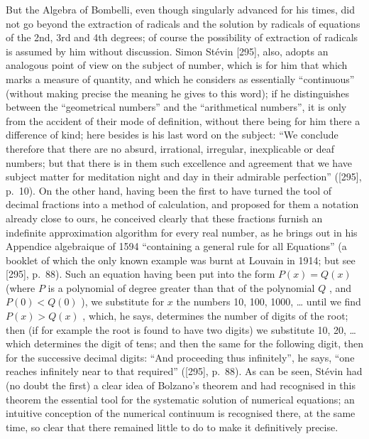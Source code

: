 But the Algebra of Bombelli, even though singularly advanced for his times, did not go beyond the extraction of radicals and the solution by radicals of equations of the 2nd, 3rd and 4th degrees; of course the possibility of extraction of radicals is assumed by him without discussion. Simon Stévin {[}295{]}, also, adopts an analogous point of view on the subject of number, which is for him that which marks a measure of quantity, and which he considers as essentially ``continuous'' (without making precise the meaning he gives to this word); if he distinguishes between the ``geometrical numbers'' and the ``arithmetical numbers'', it is only from the accident of their mode of definition, without there being for him there a difference of kind; here besides is his last word on the subject: ``We conclude therefore that there are no absurd, irrational, irregular, inexplicable or deaf numbers; but that there is in them such excellence and agreement that we have subject matter for meditation night and day in their admirable perfection'' ({[}295{]}, p.~10). On the other hand, having been the first to have turned the tool of decimal fractions into a method of calculation, and proposed for them a notation already close to ours, he conceived clearly that these fractions furnish an indefinite approximation algorithm for every real number, as he brings out in his Appendice algebraique of 1594 ``containing a general rule for all Equations'' (a booklet of which the only known example was burnt at Louvain in 1914; but see {[}295{]}, p.~88). Such an equation having been put into the form \(P(x) = Q(x)\) (where \(P\) is a polynomial of degree greater than that of the polynomial \(Q\) , and \(P(0) < Q(0)\) ), we substitute for \(x\) the numbers 10, 100, 1000, \ldots{} until we find \(P(x) > Q(x)\) , which, he says, determines the number of digits of the root; then (if for example the root is found to have two digits) we substitute 10, 20, \ldots{} which determines the digit of tens; and then the same for the following digit, then for the successive decimal digits: ``And proceeding thus infinitely'', he says, ``one reaches infinitely near to that required'' ({[}295{]}, p.~88). As can be seen, Stévin had (no doubt the first) a clear idea of Bolzano's theorem and had recognised in this theorem the essential tool for the systematic solution of numerical equations; an intuitive conception of the numerical continuum is recognised there, at the same time, so clear that there remained little to do to make it definitively precise.

